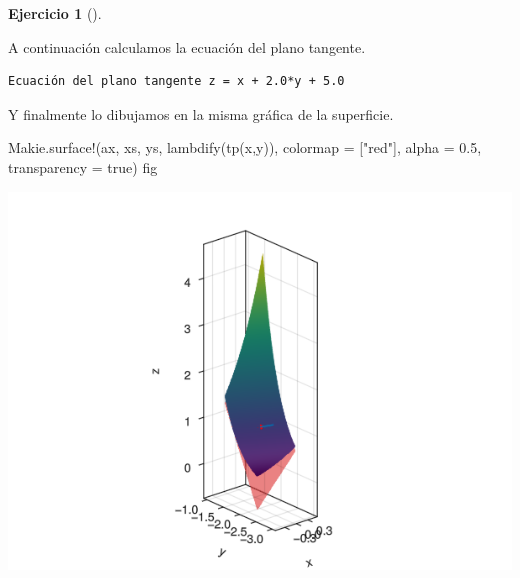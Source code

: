 \documentclass[
  a4paper,
]{scrreport}
\newenvironment{Shaded}{\begin{snugshade}}{\end{snugshade}}
\newcommand{\BuiltInTok}[1]{\textcolor[rgb]{0.00,0.23,0.31}{#1}}
\newcommand{\ConstantTok}[1]{\textcolor[rgb]{0.56,0.35,0.01}{#1}}
\newcommand{\FloatTok}[1]{\textcolor[rgb]{0.68,0.00,0.00}{#1}}
\newcommand{\FunctionTok}[1]{\textcolor[rgb]{0.28,0.35,0.67}{#1}}
\newcommand{\ImportTok}[1]{\textcolor[rgb]{0.00,0.46,0.62}{#1}}
\newcommand{\NormalTok}[1]{\textcolor[rgb]{0.00,0.23,0.31}{#1}}
\newcommand{\OperatorTok}[1]{\textcolor[rgb]{0.37,0.37,0.37}{#1}}
\newcommand{\SpecialCharTok}[1]{\textcolor[rgb]{0.37,0.37,0.37}{#1}}
\newcommand{\StringTok}[1]{\textcolor[rgb]{0.13,0.47,0.30}{#1}}
\theoremstyle{definition}
\newtheorem{exercise}{Ejercicio}[chapter]
\theoremstyle{remark}
\begin{document}
\begin{exercise}[]
\begin{tcolorbox}
A continuación calculamos la ecuación del plano tangente.

\begin{Shaded}
\end{Shaded}

\begin{verbatim}
Ecuación del plano tangente z = x + 2.0*y + 5.0
\end{verbatim}

Y finalmente lo dibujamos en la misma gráfica de la superficie.

\begin{Shaded}
\begin{Highlighting}[]
\NormalTok{Makie.}\FunctionTok{surface!}\NormalTok{(ax, xs, ys, }\FunctionTok{lambdify}\NormalTok{(}\FunctionTok{tp}\NormalTok{(x,y)), colormap }\OperatorTok{=}\NormalTok{ [}\StringTok{"red"}\NormalTok{], alpha }\OperatorTok{=} \FloatTok{0.5}\NormalTok{, transparency }\OperatorTok{=} \ConstantTok{true}\NormalTok{)}
\NormalTok{fig}
\end{Highlighting}
\end{Shaded}

\includegraphics{09-derivadas-funciones-varias-variables_files/figure-pdf/cell-32-output-1.png}

\end{tcolorbox}

\end{exercise}
\end{document}
